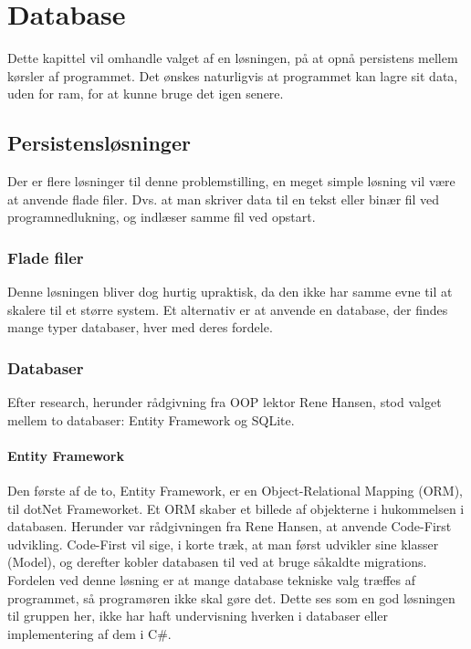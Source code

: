 \chapter{Database}

Dette kapittel vil omhandle valget af en løsningen, på at opnå persistens mellem kørsler af programmet.
Det ønskes naturligvis at programmet kan lagre sit data, uden for ram, for at kunne bruge det igen senere.

\section{Persistensløsninger}

Der er flere løsninger til denne problemstilling, en meget simple løsning vil være at anvende flade filer. 
Dvs. at man skriver data til en tekst eller binær fil ved programnedlukning, og indlæser samme fil ved opstart.

\subsection{Flade filer}
Denne løsningen bliver dog hurtig upraktisk, da den ikke har samme evne til at skalere til et større system.
Et alternativ er at anvende en database, der findes mange typer databaser, hver med deres fordele.

\subsection{Databaser}
Efter research, herunder rådgivning fra OOP lektor Rene Hansen, stod valget mellem to databaser: Entity Framework og SQLite.

\subsubsection*{Entity Framework}
Den første af de to, Entity Framework, er en Object-Relational Mapping (ORM), til dotNet Frameworket.
Et ORM skaber et billede af objekterne i hukommelsen i databasen. 
Herunder var rådgivningen fra Rene Hansen, at anvende Code-First udvikling. 
Code-First vil sige, i korte træk, at man først udvikler sine klasser (Model), og derefter kobler databasen til ved at bruge såkaldte migrations. 
Fordelen ved denne løsning er at mange database tekniske valg træffes af programmet, så programøren ikke skal gøre det. 
Dette ses som en god løsningen til gruppen her, ikke har haft undervisning hverken i databaser eller implementering af dem i C\#.

